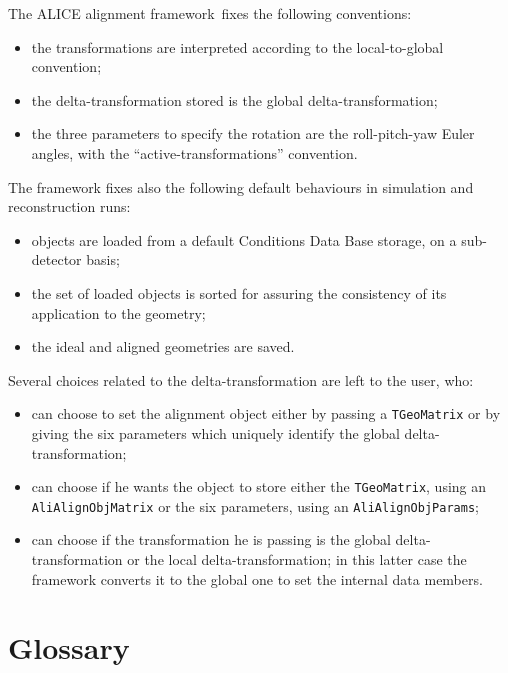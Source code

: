 \documentclass[12pt,a4paper,twoside]{article}
\newcommand{\FR}{ALICE alignment framework}
\begin{document}
{The \FR\ fixes the following conventions:
\begin{itemize}
  \item the transformations are interpreted according to the
    local-to-global convention;
  \item the delta-transformation stored is the global delta-transformation;
  \item the three parameters to specify the rotation are the
   roll-pitch-yaw Euler angles, with the ``active-transformations'' convention.
\end{itemize}
The framework fixes also the following default behaviours in
simulation and reconstruction runs:
\begin{itemize}
  \item objects are loaded from a default Conditions Data Base
    storage, on a sub-detector basis;
  \item the set of loaded objects is sorted for assuring the consistency
    of its application to the geometry;
  \item the ideal and aligned geometries are saved.
\end{itemize}
Several choices related to the delta-transformation are left to the user, who:
\begin{itemize}
\item can choose to set the alignment object either by passing a
     \lstinline!TGeoMatrix! or by giving the six parameters which uniquely
     identify the global delta-transformation;
\item can choose if he wants the object to store either the
  \lstinline!TGeoMatrix!, using an \lstinline!AliAlignObjMatrix! or the six
  parameters, using an \lstinline!AliAlignObjParams!;
\item can choose if the transformation he is passing is the global
  delta-transformation or the local delta-transformation; in this
  latter case the framework converts it to the global one to set the
  internal data members.
\end{itemize}

\newpage
\section{Glossary}

\begin{description}


\end{description}}
\end{document}
